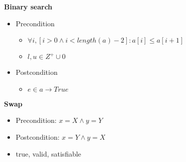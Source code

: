 \documentclass[12pt]{article}
\newcommand{\tb}[1]{\textbf{#1}}
\begin{document}
\par \tb{Binary search}
\begin{itemize}
  \item{Precondition}
    \begin{itemize}
      \item $ \forall i, [i > 0 \land i < length(a) - 2]: a[i] \leq a[i + 1]$
      \item $l, u \in Z^{+} \cup {0}$
    \end{itemize}

  \item{Postcondition}
    \begin{itemize}
      \item $e \in a \rightarrow True$
    \end{itemize}
\end{itemize}

\par \tb{Swap}
  \begin{itemize}
    \item Precondition: $x = X \land y = Y$
    \item Postcondition: $x = Y \land y = X$
  \end{itemize}

\begin{itemize}
    \item true, valid, satisfiable
\end{itemize}
\end{document}
